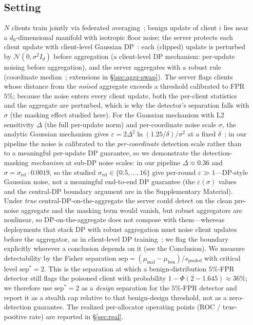 \documentclass[final,1p,times]{elsarticle}
\begin{document}
\subsection{Setting}\label{sec:setting}
$N$ clients train jointly via federated averaging~\cite{mcmahan2017,kairouz2021advances};
benign update of client $i$ lies near a $d_0$-dimensional
manifold with isotropic floor noise; the server protects each client
update with client-level Gaussian DP~\cite{dwork2014algorithmic,mcmahan2018dp}: each
(clipped) update is perturbed by $\mathcal{N}(0,\sigma^2 I_d)$ before
aggregation (a client-level DP mechanism: per-update noising before
aggregation), and the server aggregates with a robust rule
(coordinate median~\cite{yin2018,huber1964robust}; extensions in \S\ref{sec:aggr-swap}). The server
flags clients whose distance from the \emph{noised} aggregate exceeds a threshold
calibrated to FPR $5\%$; because the noise enters every client update, both the
per-client statistics and the aggregate are perturbed, which is why the
detector's separation falls with $\sigma$ (the masking effect studied here). For the
Gaussian mechanism with L2 sensitivity $\Delta$ (the full per-update
norm) and per-coordinate noise scale $\sigma$, the analytic Gaussian
mechanism gives $\varepsilon = 2\Delta^2\ln(1.25/\delta)/\sigma^2$ at a
fixed $\delta$~\cite{dwork2006calibrating}; in our pipeline the noise is
calibrated to the \emph{per-coordinate} detection scale rather than to a
meaningful per-update DP guarantee, so we demonstrate the detection-masking
\emph{mechanism} at sub-DP noise scales: in our pipeline
$\Delta\approx0.36$ and $\sigma=\sigma_{\mathrm{rel}}\cdot0.0019$, so the
studied $\sigma_{\mathrm{rel}}\in\{0.5,\dots,16\}$ give per-round
$\varepsilon\gg1$---DP-style Gaussian noise, not a meaningful end-to-end
DP guarantee (the $\varepsilon(\sigma)$ values
and the central-DP boundary argument are in the Supplementary Material).
Under \emph{true} central-DP-on-the-aggregate the server could detect on
the clean pre-noise aggregate and the masking term would vanish, but robust
aggregators are nonlinear, so DP-on-the-aggregate does not compose with
them---whereas deployments that stack DP with robust aggregation must
noise client updates before the aggregator, as in client-level DP
training~\cite{mcmahan2018dp}; we flag the boundary explicitly wherever a
conclusion depends on it (see the Conclusion). We measure
detectability by the Fisher
separation $\mathrm{sep}=(\mu_{\mathrm{mal}}-\mu_{\mathrm{ben}})/s_{\mathrm{pooled}}$
with critical level $\mathrm{sep}^{*}=2$. This is the separation at which a
benign-distribution $5\%$-FPR detector still flags the poisoned client with
probability $1-\Phi(2-1.645)\approx 36\%$; we therefore use
$\mathrm{sep}^{*}=2$ as a \emph{design} separation for the $5\%$-FPR detector
and report it as a stealth cap relative to that benign-design threshold, not as
a zero-detection guarantee. The realized per-allocator operating points (ROC /
true-positive rate) are reported in \S\ref{sec:real}.
\end{document}

